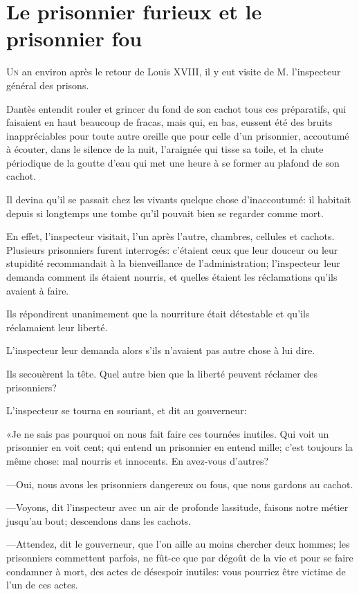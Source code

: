 \chapter{Le prisonnier furieux et le prisonnier fou}

\lettrine{U}{n} an environ après le retour de Louis XVIII, il y eut visite de M. l'inspecteur général des prisons.

\zz
Dantès entendit rouler et grincer du fond de son cachot tous ces préparatifs, qui faisaient en haut beaucoup de fracas, mais qui, en bas, eussent été des bruits inappréciables pour toute autre oreille que pour celle d'un prisonnier, accoutumé à écouter, dans le silence de la nuit, l'araignée qui tisse sa toile, et la chute périodique de la goutte d'eau qui met une heure à se former au plafond de son cachot.

Il devina qu'il se passait chez les vivants quelque chose d'inaccoutumé: il habitait depuis si longtemps une tombe qu'il pouvait bien se regarder comme mort.

En effet, l'inspecteur visitait, l'un après l'autre, chambres, cellules et cachots. Plusieurs prisonniers furent interrogés: c'étaient ceux que leur douceur ou leur stupidité recommandait à la bienveillance de l'administration; l'inspecteur leur demanda comment ils étaient nourris, et quelles étaient les réclamations qu'ils avaient à faire.

Ils répondirent unanimement que la nourriture était détestable et qu'ils réclamaient leur liberté.

L'inspecteur leur demanda alors s'ils n'avaient pas autre chose à lui dire.

Ils secouèrent la tête. Quel autre bien que la liberté peuvent réclamer des prisonniers?

L'inspecteur se tourna en souriant, et dit au gouverneur:

«Je ne sais pas pourquoi on nous fait faire ces tournées inutiles. Qui voit un prisonnier en voit cent; qui entend un prisonnier en entend mille; c'est toujours la même chose: mal nourris et innocents. En avez-vous d'autres?

—Oui, nous avons les prisonniers dangereux ou fous, que nous gardons au cachot.

—Voyons, dit l'inspecteur avec un air de profonde lassitude, faisons notre métier jusqu'au bout; descendons dans les cachots.

—Attendez, dit le gouverneur, que l'on aille au moins chercher deux hommes; les prisonniers commettent parfois, ne fût-ce que par dégoût de la vie et pour se faire condamner à mort, des actes de désespoir inutiles: vous pourriez être victime de l'un de ces actes.

